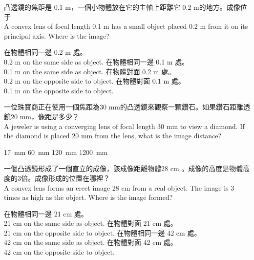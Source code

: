 \documentclass[beamer=true]{standalone}
\begin{document}
\begin{eg}
    凸透鏡的焦距是 0.1 m，一個小物體放在它的主軸上距離它 0.2 m的地方。成像位于\\A convex lens of focal length 0.1 m has a small object placed 0.2 m from it on its principal axis. Where is the image?
    \begin{tasks}
        \task 在物體相同一邊 0.2 m 處。\\
        0.2 m on the same side as object.
        \task 在物體相同一邊 0.1 m 處。\\
        0.1 m on the same side as object.
        \task 在物體對面 0.2 m 處。\\0.2 m on the opposite side to object.
        \task 在物體對面 0.1 m 處。\\0.1 m on the opposite side to object.
    \end{tasks}
\end{eg}

\begin{eg}
    一位珠寶商正在使用一個焦距為30 mm的凸透鏡來觀察一顆鑽石。如果鑽石距離透鏡20 mm，像距是多少？\\A jeweler is using a converging lens of focal length 30 mm to view a diamond. If the diamond is placed 20 mm from the lens, what is the image distance?
    \begin{tasks}
        \task \qty{17}{mm}
        \task \qty{60}{mm}
        \task \qty{120}{mm}
        \task \qty{1200}{mm}
    \end{tasks}
\end{eg}



\begin{eg}
    一個凸透鏡形成了一個直立的成像，該成像距離物體28 cm 。成像的高度是物體高度的3倍。成像形成的位置在哪裡？\\A convex lens forms an erect image 28 cm from a real object. The image is 3 times as high as the object. Where is the image formed?
    \begin{tasks}
        \task 在物體相同一邊 21 cm 處。\\
        21 cm on the same side as object.
        \task 在物體對面 21 cm 處。\\
        21 cm on the opposite side to object.
        \task 在物體相同一邊 42 cm 處。\\
        42 cm on the same side as object.
        \task 在物體對面 42 cm 處。\\
        42 cm on the opposite side to object.
    \end{tasks}

\end{eg}
\end{document}
